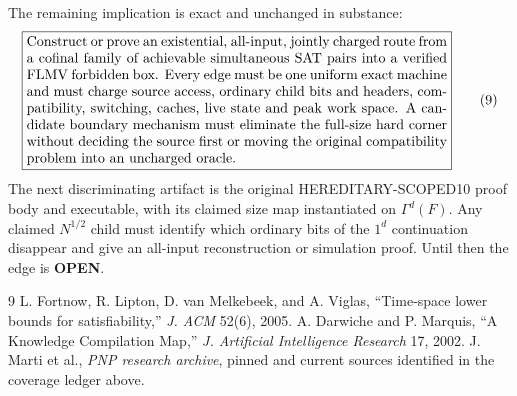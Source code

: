 \documentclass[11pt]{article}
\newcommand{\Gam}{\Gamma}
\begin{document}
The remaining implication is exact and unchanged in substance:
\[
\boxed{\begin{minipage}{.87\linewidth}
Construct or prove an existential, all-input, jointly charged route from a
cofinal family of achievable simultaneous SAT pairs into a verified FLMV
forbidden box.  Every edge must be one uniform exact machine and must charge
source access, ordinary child bits and headers, compatibility, switching,
caches, live state and peak work space.  A candidate boundary mechanism
must eliminate the full-size hard corner without deciding the source first
or moving the original compatibility problem into an uncharged oracle.
\end{minipage}}                                                     \tag{9}
\]
The next discriminating artifact is the original HEREDITARY-SCOPED10 proof
body and executable, with its claimed size map instantiated on
$\Gam^d(F)$.  Any claimed $N^{1/2}$ child must identify which ordinary bits
of the $1^d$ continuation disappear and give an all-input reconstruction or
simulation proof.  Until then the edge is \textbf{OPEN}.

\begin{thebibliography}{9}
L. Fortnow, R. Lipton, D. van Melkebeek, and A. Viglas,
``Time-space lower bounds for satisfiability,'' \emph{J. ACM} 52(6), 2005.
A. Darwiche and P. Marquis, ``A Knowledge Compilation Map,''
\emph{J. Artificial Intelligence Research} 17, 2002.
J. Marti et al., \emph{PNP research archive}, pinned and current sources
identified in the coverage ledger above.
\end{thebibliography}
\end{document}
